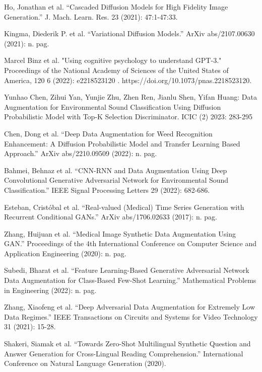 \documentclass[preprint,12pt,authoryear]{elsarticle}
\begin{document}
\begin{thebibliography}{00}
Ho, Jonathan et al. “Cascaded Diffusion Models for High Fidelity Image Generation.” J. Mach. Learn. Res. 23 (2021): 47:1-47:33.

Kingma, Diederik P. et al. “Variational Diffusion Models.” ArXiv abs/2107.00630 (2021): n. pag.

Marcel Binz et al. "Using cognitive psychology to understand GPT-3." Proceedings of the National Academy of Sciences of the United States of America, 120 6 (2022): e2218523120 . https://doi.org/10.1073/pnas.2218523120.

 Yunhao Chen, Zihui Yan, Yunjie Zhu, Zhen Ren, Jianlu Shen, Yifan Huang: Data Augmentation for Environmental Sound Classification Using Diffusion Probabilistic Model with Top-K Selection Discriminator. ICIC (2) 2023: 283-295

Chen, Dong et al. “Deep Data Augmentation for Weed Recognition Enhancement: A Diffusion Probabilistic Model and Transfer Learning Based Approach.” ArXiv abs/2210.09509 (2022): n. pag.

Bahmei, Behnaz et al. “CNN-RNN and Data Augmentation Using Deep Convolutional Generative Adversarial Network for Environmental Sound Classification.” IEEE Signal Processing Letters 29 (2022): 682-686.

Esteban, Cristóbal et al. “Real-valued (Medical) Time Series Generation with Recurrent Conditional GANs.” ArXiv abs/1706.02633 (2017): n. pag.

Zhang, Huijuan et al. “Medical Image Synthetic Data Augmentation Using GAN.” Proceedings of the 4th International Conference on Computer Science and Application Engineering (2020): n. pag.

Subedi, Bharat et al. “Feature Learning-Based Generative Adversarial Network Data Augmentation for Class-Based Few-Shot Learning.” Mathematical Problems in Engineering (2022): n. pag.

Zhang, Xiaofeng et al. “Deep Adversarial Data Augmentation for Extremely Low Data Regimes.” IEEE Transactions on Circuits and Systems for Video Technology 31 (2021): 15-28.

Shakeri, Siamak et al. “Towards Zero-Shot Multilingual Synthetic Question and Answer Generation for Cross-Lingual Reading Comprehension.” International Conference on Natural Language Generation (2020).
 


\end{thebibliography}
\end{document}
